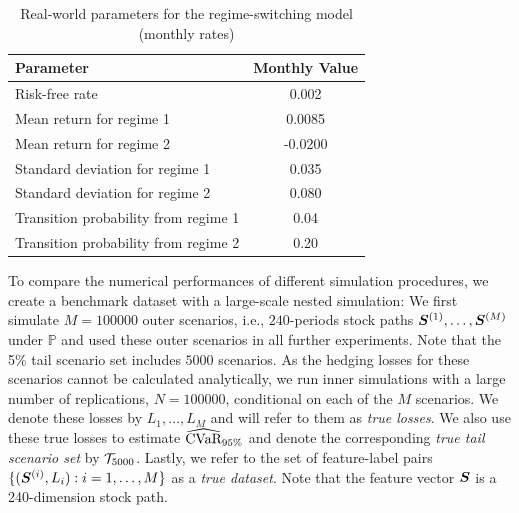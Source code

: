 \begin{table}[ht]
    \centering
    \begin{tabular}{lc}
        \toprule
        \textbf{Parameter}  & \textbf{Monthly Value} \\
        \midrule
        Risk-free rate & 0.002 \\
        Mean return for regime 1  & 0.0085 \\
        Mean return for regime 2   & -0.0200 \\
        Standard deviation for regime 1  & 0.035 \\
        Standard deviation for regime 2  & 0.080 \\
        Transition probability from regime 1  & 0.04 \\
        Transition probability from regime 2  & 0.20 \\
        \bottomrule
    \end{tabular}
    \caption{Real-world parameters for the regime-switching model (monthly rates)}
    \label{tab:regime_params}
\end{table}

To compare the numerical performances of different simulation procedures, we create a benchmark dataset with a large-scale nested simulation: We first simulate $M=\num{100000}$ outer scenarios, i.e., $240$-periods stock paths $\bm{S}^{(1)},\ldots,\bm{S}^{(M)}$ under $\mathbb{P}$ and used these outer scenarios in all further experiments.
Note that the 5\% tail scenario set includes $\num{5000}$ scenarios.
As the hedging losses for these scenarios cannot be calculated analytically, we run inner simulations with a large number of replications, $N=\num{100000}$, conditional on each of the $M$ scenarios.
We denote these losses by $L_1,\ldots,L_M$ and will refer to them as \textit{true losses}.
We also use these true losses to estimate $\widehat{\mbox{CVaR}}_{95\%}$ and denote the corresponding \textit{true tail scenario set} by $\mathcal{T}_{5000}$.
Lastly, we refer to the set of feature-label pairs $\{(\bm{S}^{(i)}, L_i): i=1,\ldots,M\}$ as a \textit{true dataset}.
Note that the feature vector $\bm{S}$ is a 240-dimension stock path.

